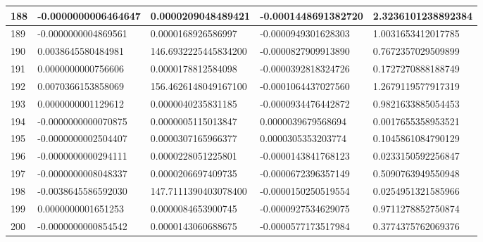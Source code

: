 \begin{center}
\begin{longtable}{|p{0.5cm}|p{3.5cm}|p{3.5cm}|p{3.5cm}|p{3.5cm}|}
\hline
188  & -0.0000000006464647  & 0.0000209048489421  & -0.0001448691382720  & 2.3236101238892384\\
\hline
189  & -0.0000000004869561  & 0.0000168926586997  & -0.0000949301628303  & 1.0031653412017785\\
\hline
190  & 0.0038645580484981  & 146.6932225445834200  & -0.0000827909913890  & 0.7672357029509899\\
\hline
191  & 0.0000000000756606  & 0.0000178812584098  & -0.0000392818324726  & 0.1727270888188749\\
\hline
192  & 0.0070366153858069  & 156.4626148049167100  & -0.0001064437027560  & 1.2679119577917319\\
\hline
193  & 0.0000000001129612  & 0.0000040235831185  & -0.0000934476442872  & 0.9821633885054453\\
\hline
194  & -0.0000000000070875  & 0.0000005115013847  & 0.0000039679568694  & 0.0017655358953521\\
\hline
195  & -0.0000000002504407  & 0.0000307165966377  & 0.0000305353203774  & 0.1045861084790129\\
\hline
196  & -0.0000000000294111  & 0.0000228051225801  & -0.0000143841768123  & 0.0233150592256847\\
\hline
197  & -0.0000000008048337  & 0.0000206697409735  & -0.0000672396357149  & 0.5090763949550948\\
\hline
198  & -0.0038645586592030  & 147.7111390403078400  & -0.0000150250519554  & 0.0254951321585966\\
\hline
199  & 0.0000000001651253  & 0.0000084653900745  & -0.0000927534629075  & 0.9711278852750874\\
\hline
200  & -0.0000000000854542  & 0.0000143060688675  & -0.0000577173517984  & 0.3774375762069376\\
\hline
\end{longtable}
\end{center}